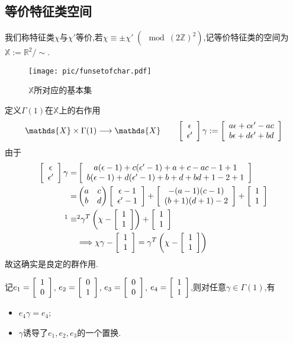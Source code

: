 \subsection{等价特征类空间}
\begin{defn}
	我们称特征类$\chi$与$\chi'$等价,若$\chi \equiv \pm \chi' \;(\!\!\!\!\mod (2\mathbb{Z})^2)$,记等价特征类的空间为$\mathds{X}:=\mathbb{R}^2/\sim$.
\end{defn}
\begin{figure}[ht]
	
	\begin{minipage}[t]{.9\textwidth}
		\vspace{0.1cm}
		\centering
		\texttt{[image: pic/funsetofchar.pdf]}
		
	\end{minipage}
	\caption{$\mathds{X}$所对应的基本集}
	\label{pic:basicsetofchar}
\end{figure}
\begin{defn}
	定义$\Gamma(1)$在$\mathds{X}$上的右作用
	$$\mathds{X} \times \Gamma(1) \longrightarrow \mathds{X} \qquad \normalcharacter \gamma := \character{a\epsilon+c\epsilon'-ac}{b\epsilon+d\epsilon'+bd}$$
	由于
	\begin{equation*}
	\begin{aligned}
	\normalcharacter \gamma =& \character{a(\epsilon-1)+c(\epsilon'-1)+a+c-ac-1+1}{b(\epsilon-1)+d(\epsilon'-1)+b+d+bd+1-2+1}\\
	=& \begin{pmatrix}
	a & c \\ b & d
	\end{pmatrix}
	\character{\epsilon-1}{\epsilon'-1}+\character{-(a-1)(c-1)}{(b+1)(d+1)-2}+\character{1}{1}\\
	\footnotemark\equiv &\footnotemark\gamma^T \left(\chi-\character{1}{1}\right)+\character{1}{1}\\
	& \Longrightarrow \chi\gamma-\character{1}{1}=\gamma^T\left(\chi-\character{1}{1}\right)
	\end{aligned}
	\end{equation*}
	故这确实是良定的群作用.
\end{defn}
\begin{remark}
	记$e_1=\left[\begin{array}{c}{1} \\ {0}\end{array}\right]$, $e_2=\left[\begin{array}{c}{0} \\ {1}\end{array}\right]$, $e_3=\left[\begin{array}{c}{0} \\ {0}\end{array}\right]$, $e_4=\left[\begin{array}{c}{1} \\ {1}\end{array}\right]$,则对任意$\gamma \in \Gamma(1)$,有
	\begin{itemize}
		\item $e_4\gamma=e_4$;
		\item $\gamma$诱导了$e_1,e_2,e_3$的一个置换.
	\end{itemize}
\end{remark}
